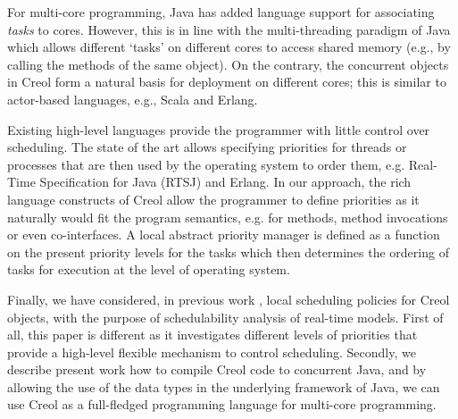 %


For multi-core programming, Java has added language support for associating {\em
tasks} to cores. However, this is in line with the multi-threading
paradigm of Java which allows different `tasks' on different cores to access shared memory
(e.g., by calling the methods of the same object). On the contrary, the
concurrent objects in Creol form a natural basis for deployment on different
cores; this is similar to actor-based languages, e.g., Scala and Erlang.


Existing high-level languages provide the programmer with little control over
scheduling. The state of the art allows specifying priorities for threads or
processes that are then used by the operating system to order them, e.g.
Real-Time Specification for Java (RTSJ) and Erlang. In our approach, the rich
language constructs of Creol allow the programmer to define priorities as it
naturally would fit the program semantics, e.g. for methods, method invocations
or even co-interfaces. A local abstract priority manager is defined as a
function on the present priority levels for the tasks which then determines the
ordering of tasks for execution at the level of operating system.


Finally, we have considered, in previous work \cite{jaghoori_dating}, local
scheduling policies for Creol objects, with the purpose of schedulability
analysis of real-time models. First of all, this paper is different as it
investigates different levels of priorities that provide a high-level flexible
mechanism to control scheduling. Secondly, we describe present work how to
compile Creol code to concurrent Java, and by allowing the use of the data types
in the underlying framework of Java, we can use Creol as a full-fledged
programming language for multi-core programming.




